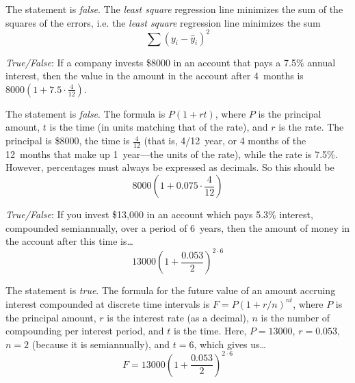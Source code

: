 \documentclass[11pt,letterpaper]{article}
\begin{document}
\sol The statement is \textit{false}. The \textit{least square} regression line minimizes the sum of the squares of the errors, i.e. the \textit{least square} regression line minimizes the sum
	\[
	\sum (y_i - \widehat{y}_i)^2 
	\] \pvspace{1cm}



\quizsol \textit{True/False}: If a company invests \$8000 in an account that pays a 7.5\% annual interest, then the value in the amount in the account after 4~months is $8000 \left(1 + 7.5 \cdot \frac{4}{12} \right)$. \pspace

\sol The statement is \textit{false}. The formula is $P (1 + rt)$, where $P$ is the principal amount, $t$ is the time (in units matching that of the rate), and $r$ is the rate. The principal is \$8000, the time is $\frac{4}{12}$ (that is, 4/12~year, or 4 months of the 12~months that make up 1~year---the units of the rate), while the rate is 7.5\%. However, percentages must always be expressed as decimals. So this should be
	\[
	8000 \left(1 + 0.075 \cdot \frac{4}{12} \right)
	\]


\quizsol \textit{True/False}: If you invest \$13,000 in an account which pays 5.3\% interest, compounded semiannually, over a period of 6~years, then the amount of money in the account after this time is\dots
	\[
	13000 \left(1 + \dfrac{0.053}{2} \right)^{2 \cdot 6}
	\]

\sol The statement is \textit{true}. The formula for the future value of an amount accruing interest compounded at discrete time intervals is $F= P (1 + r/n)^{nt}$, where $P$ is the principal amount, $r$ is the interest rate (as a decimal), $n$ is the number of compounding per interest period, and $t$ is the time. Here, $P= 13000$, $r= 0.053$, $n= 2$ (because it is semiannually), and $t= 6$, which gives us\dots
	\[
	F= 13000 \left(1 + \dfrac{0.053}{2} \right)^{2 \cdot 6}
	\]
\end{document}
